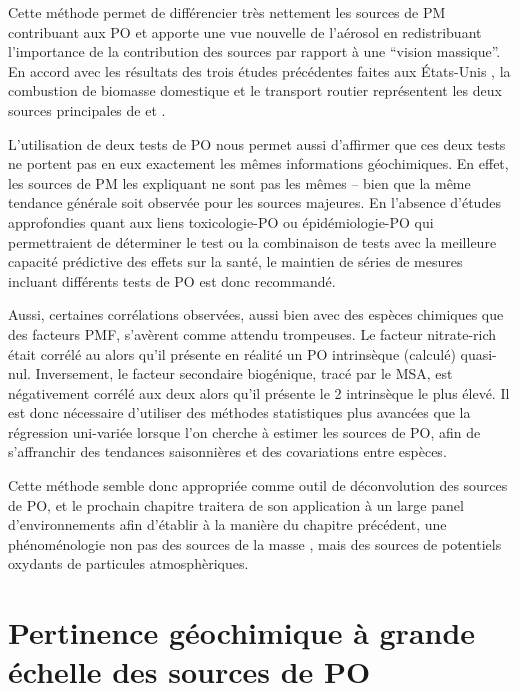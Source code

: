 Cette méthode permet de différencier très nettement les sources de PM contribuant aux PO
et apporte une vue nouvelle de l'aérosol en redistribuant l'importance de la contribution
des sources par rapport à une ``vision massique''. En accord avec les résultats des trois
études précédentes faites aux États-Unis
\autocite{vermaReactive2014,batesReactive2015,fangOxidative2016}, la combustion de
biomasse domestique et le transport routier représentent les deux sources principales de
\POAAv{} et \PODTTv.

L'utilisation de deux tests de PO nous permet aussi d'affirmer que ces deux tests ne portent
pas en eux exactement les mêmes informations géochimiques. En effet, les sources de PM les
expliquant ne sont pas les mêmes -- bien que la même tendance générale soit observée pour les sources
majeures. En l'absence d'études approfondies quant aux liens toxicologie-PO ou
épidémiologie-PO qui permettraient de déterminer le test ou la combinaison de tests avec la
meilleure capacité prédictive des effets sur la santé, le maintien de séries de mesures
incluant
différents tests de PO est donc recommandé.

Aussi, certaines corrélations observées, aussi bien avec des espèces chimiques que des
facteurs PMF, s'avèrent comme attendu trompeuses. Le facteur nitrate-rich était corrélé au
\POAAv{} alors qu'il présente en réalité un PO intrinsèque (calculé) quasi-nul. Inversement, le facteur
secondaire biogénique, tracé par le MSA, est négativement corrélé aux deux \OPv{} alors
qu'il présente le 2\ieme{} \PODTT{} intrinsèque le plus élevé. Il est donc nécessaire
d'utiliser des méthodes statistiques plus avancées que la régression uni-variée lorsque
l'on cherche à estimer les sources de PO, afin de s'affranchir des tendances saisonnières et
des covariations entre espèces.

Cette méthode semble donc appropriée comme outil de déconvolution des sources de PO, et le
prochain chapitre traitera de son application à un large panel d'environnements afin
d'établir à la manière du chapitre précédent, une phénoménologie non pas des sources de la
masse \PMdix, mais des sources de potentiels oxydants de particules atmosphèriques.


\clearpage
\section{Pertinence géochimique à grande échelle des sources de PO}%
\label{sec:synthèse_grande_échelle}

